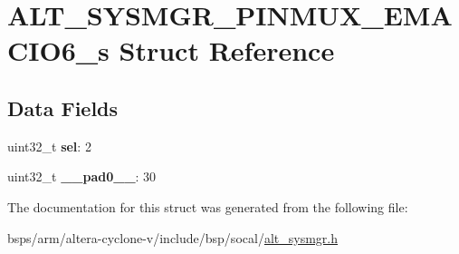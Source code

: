 \hypertarget{structALT__SYSMGR__PINMUX__EMACIO6__s}{}\section{A\+L\+T\+\_\+\+S\+Y\+S\+M\+G\+R\+\_\+\+P\+I\+N\+M\+U\+X\+\_\+\+E\+M\+A\+C\+I\+O6\+\_\+s Struct Reference}
\label{structALT__SYSMGR__PINMUX__EMACIO6__s}
\subsection*{Data Fields}
\begin{DoxyCompactItemize}
\item 
\mbox{\label{structALT__SYSMGR__PINMUX__EMACIO6__s_a2b9f12eaa389e53d3cb9754dde5b24e5}} 
uint32\+\_\+t {\bfseries sel}\+: 2
\item 
\mbox{\label{structALT__SYSMGR__PINMUX__EMACIO6__s_a36452f8d3aefdadff49bfc760e41e73e}} 
uint32\+\_\+t {\bfseries \+\_\+\+\_\+pad0\+\_\+\+\_\+}\+: 30
\end{DoxyCompactItemize}


The documentation for this struct was generated from the following file\+:\begin{DoxyCompactItemize}
\item 
bsps/arm/altera-\/cyclone-\/v/include/bsp/socal/\mbox{\hyperlink{alt__sysmgr_8h}{alt\+\_\+sysmgr.\+h}}\end{DoxyCompactItemize}
